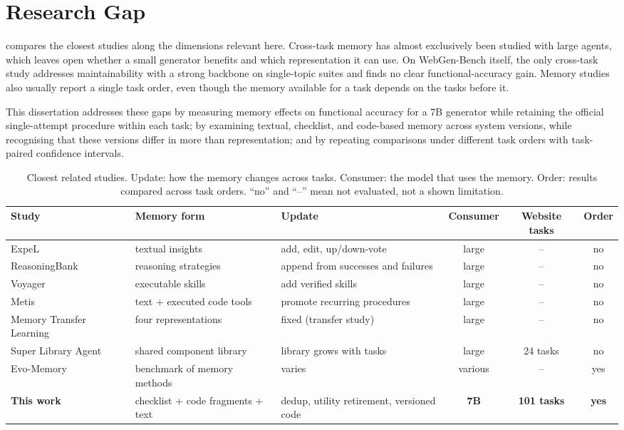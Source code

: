 \section{Research Gap}
\label{sec:gap}
 compares the closest studies along the dimensions relevant here. Cross-task memory has almost exclusively been studied with large agents, which leaves open whether a small generator benefits and which representation it can use. On WebGen-Bench itself, the only cross-task study addresses maintainability with a strong backbone on single-topic suites and finds no clear functional-accuracy gain. Memory studies also usually report a single task order, even though the memory available for a task depends on the tasks before it.

This dissertation addresses these gaps by measuring memory effects on functional accuracy for a 7B generator while retaining the official single-attempt procedure within each task; by examining textual, checklist, and code-based memory across system versions, while recognising that these versions differ in more than representation; and by repeating comparisons under different task orders with task-paired confidence intervals.

\begin{table}[ht]
\centering
\caption{Closest related studies. Update: how the memory changes across tasks. Consumer: the model that uses the memory. Order: results compared across task orders. ``no'' and ``--'' mean not evaluated, not a shown limitation.}
\label{tab:related}
\small
\begin{tabularx}{\textwidth}{>{\raggedright\arraybackslash}p{3.3cm}>{\raggedright\arraybackslash}X>{\raggedright\arraybackslash}X ccc}
\toprule
Study & Memory form & Update & Consumer & Website tasks & Order \\
\midrule
ExpeL~\cite{zhao2024expel} & textual insights & add, edit, up/down-vote & large & -- & no \\
ReasoningBank~\cite{reasoningbank2025} & reasoning strategies & append from successes and failures & large & -- & no \\
Voyager~\cite{wang2023voyager} & executable skills & add verified skills & large & -- & no \\
Metis~\cite{dai2026metis} & text + executed code tools & promote recurring procedures & large & -- & no \\
Memory Transfer Learning~\cite{kim2026mtl} & four representations & fixed (transfer study) & large & -- & no \\
Super Library Agent~\cite{sung2026superlibrary} & shared component library & library grows with tasks & large & 24 tasks & no \\
Evo-Memory~\cite{wei2025evomemory} & benchmark of memory methods & varies & various & -- & yes \\
\textbf{This work} & checklist + code fragments + text & dedup, utility retirement, versioned code & \textbf{7B} & \textbf{101 tasks} & \textbf{yes} \\
\bottomrule
\end{tabularx}
\end{table}
